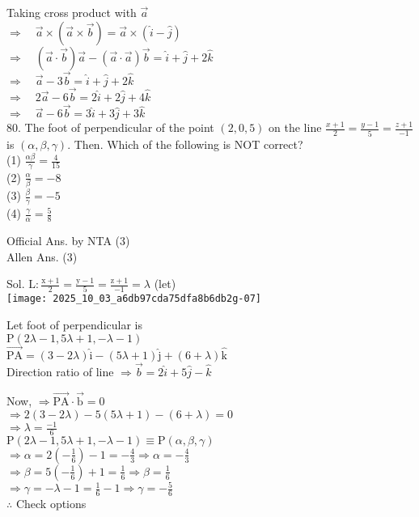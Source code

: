 \documentclass[10pt]{article}
\begin{document}
Taking cross product with \(\vec{a}\)\\
\(\Rightarrow \quad \vec{a} \times(\vec{a} \times \vec{b})=\vec{a} \times(\hat{i}-\hat{j})\)\\
\(\Rightarrow \quad(\vec{a} \cdot \vec{b}) \vec{a}-(\vec{a} \cdot \vec{a}) \vec{b}=\hat{i}+\hat{j}+2 \hat{k}\)\\
\(\Rightarrow \quad \vec{a}-3 \vec{b}=\hat{i}+\hat{j}+2 \hat{k}\)\\
\(\Rightarrow \quad 2 \vec{a}-6 \vec{b}=2 \hat{i}+2 \hat{j}+4 \hat{k}\)\\
\(\Rightarrow \quad \vec{a}-6 \vec{b}=3 \hat{i}+3 \hat{j}+3 \hat{k}\)\\
80. The foot of perpendicular of the point \((2,0,5)\) on the line \(\frac{x+1}{2}=\frac{y-1}{5}=\frac{z+1}{-1}\) is \((\alpha, \beta, \gamma)\). Then. Which of the following is NOT correct?\\
(1) \(\frac{\alpha \beta}{\gamma}=\frac{4}{15}\)\\
(2) \(\frac{\alpha}{\beta}=-8\)\\
(3) \(\frac{\beta}{\gamma}=-5\)\\
(4) \(\frac{\gamma}{\alpha}=\frac{5}{8}\)

Official Ans. by NTA (3)\\
Allen Ans. (3)

Sol. \(\mathrm{L}: \frac{\mathrm{x}+1}{2}=\frac{\mathrm{y}-1}{5}=\frac{\mathrm{z}+1}{-1}=\lambda\) (let)\\
\texttt{[image: 2025\_10\_03\_a6db97cda75dfa8b6db2g-07]}

Let foot of perpendicular is\\
\(\mathrm{P}(2 \lambda-1,5 \lambda+1,-\lambda-1)\)\\
\(\overrightarrow{\mathrm{PA}}=(3-2 \lambda) \hat{\mathrm{i}}-(5 \lambda+1) \hat{\mathrm{j}}+(6+\lambda) \hat{\mathrm{k}}\)\\
Direction ratio of line \(\Rightarrow \vec{b}=2 \hat{i}+5 \hat{j}-\hat{k}\)

Now, \(\Rightarrow \overrightarrow{\mathrm{PA}} \cdot \overrightarrow{\mathrm{b}}=0\)\\
\(\Rightarrow 2(3-2 \lambda)-5(5 \lambda+1)-(6+\lambda)=0\)\\
\(\Rightarrow \lambda=\frac{-1}{6}\)\\
\(\mathrm{P}(2 \lambda-1,5 \lambda+1,-\lambda-1) \equiv \mathrm{P}(\alpha, \beta, \gamma)\)\\
\(\Rightarrow \alpha=2\left(-\frac{1}{6}\right)-1=-\frac{4}{3} \Rightarrow \alpha=-\frac{4}{3}\)\\
\(\Rightarrow \beta=5\left(-\frac{1}{6}\right)+1=\frac{1}{6} \Rightarrow \beta=\frac{1}{6}\)\\
\(\Rightarrow \gamma=-\lambda-1=\frac{1}{6}-1 \Rightarrow \gamma=-\frac{5}{6}\)\\
\(\therefore\) Check options
\end{document}
